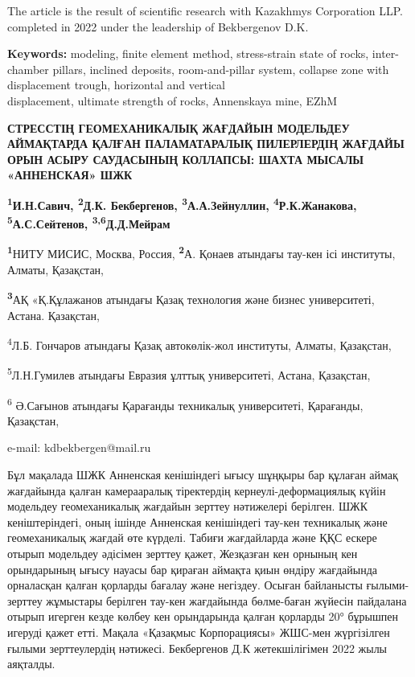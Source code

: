 The article is the result of scientific research with Kazakhmys
Corporation LLP. completed in 2022 under the leadership of Bekbergenov
D.K.

{\bfseries Keywords:} modeling, finite element method, stress-strain state
of rocks, inter-chamber pillars, inclined deposits, room-and-pillar
system, collapse zone with displacement trough, horizontal and vertical
\\displacement, ultimate strength of rocks, Annenskaya mine, EZhM

\begin{articleheader}

{\bfseries СТРЕССТІҢ ГЕОМЕХАНИКАЛЫҚ ЖАҒДАЙЫН МОДЕЛЬДЕУ АЙМАҚТАРДА ҚАЛҒАН ПАЛАМАТАРАЛЫҚ ПИЛЕРЛЕРДІҢ ЖАҒДАЙЫ ОРЫН АСЫРУ САУДАСЫНЫҢ КОЛЛАПСЫ: ШАХТА МЫСАЛЫ «АННЕНСКАЯ» ШЖК}

{\bfseries \textsuperscript{1}И.Н.Савич, \textsuperscript{2}Д.К.
Бекбергенов\textsuperscript{\envelope }, \textsuperscript{3}А.А.Зейнуллин,
\textsuperscript{4}Р.К.Жанакова, \textsuperscript{5}А.С.Сейтенов,
\textsuperscript{3,6}Д.Д.Мейрам}
\end{articleheader}
\begin{affiliation}

{\bfseries \textsuperscript{1}}НИТУ МИСИС, Москва, Россия,
{\bfseries \textsuperscript{2}}А. Қонаев атындағы тау-кен ісі институты,
Алматы, Қазақстан,

{\bfseries \textsuperscript{3}}АҚ «Қ.Құлажанов атындағы Қазақ технология
және бизнес университеті, Астана. Қазақстан,

\textsuperscript{4}Л.Б. Гончаров атындағы Қазақ автокөлік-жол институты,
Алматы, Қазақстан,

\textsuperscript{5}Л.Н.Гумилев атындағы Евразия ұлттық университеті,
Астана, Қазақстан,

\textsuperscript{6} Ә.Сағынов атындағы Қарағанды техникалық
университеті, Қарағанды, Қазақстан,

e-mail: kdbekbergen@mail.ru
\end{affiliation}

Бұл мақалада ШЖК Анненская кенішіндегі ығысу шұңқыры бар құлаған аймақ
жағдайында қалған камерааралық тіректердің кернеулі-деформациялық күйін
модельдеу геомеханикалық жағдайын зерттеу нәтижелері берілген. ШЖК
кеніштеріндегі, оның ішінде Анненская кенішіндегі тау-кен техникалық
және геомеханикалық жағдай өте күрделі. Табиғи жағдайларда және ҚҚС
ескере отырып модельдеу әдісімен зерттеу қажет, Жезқазған кен орнының
кен орындарының ығысу науасы бар қираған аймақта қиын өндіру жағдайында
орналасқан қалған қорларды бағалау және негіздеу. Осыған байланысты
ғылыми-зерттеу жұмыстары берілген тау-кен жағдайында бөлме-баған жүйесін
пайдалана отырып игерген кезде көлбеу кен орындарында қалған қорларды
20° бұрышпен игеруді қажет етті. Мақала «Қазақмыс Корпорациясы» ЖШС-мен
жүргізілген ғылыми зерттеулердің нәтижесі. Бекбергенов Д.К
жетекшілігімен 2022 жылы аяқталды.

